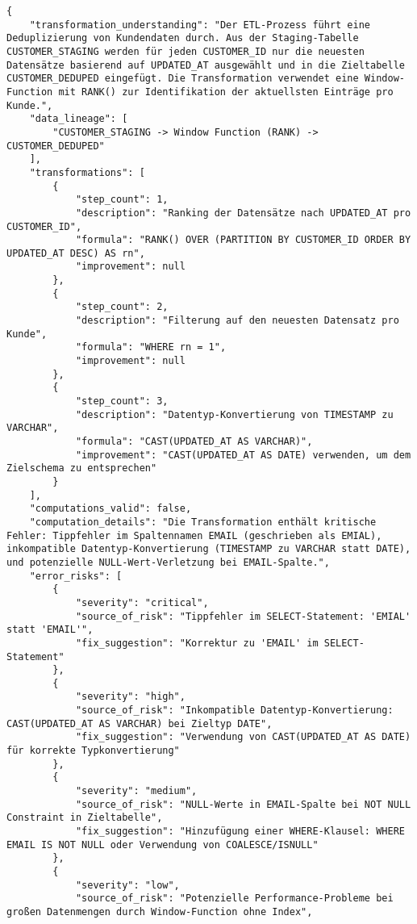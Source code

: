 \begin{lstlisting}[caption={Ausgabe: Claude Sonnet 4 Anwendungsfall 2 Robustheitsdurchlauf},label={claude_case2_prompt3}]
{
    "transformation_understanding": "Der ETL-Prozess führt eine Deduplizierung von Kundendaten durch. Aus der Staging-Tabelle CUSTOMER_STAGING werden für jeden CUSTOMER_ID nur die neuesten Datensätze basierend auf UPDATED_AT ausgewählt und in die Zieltabelle CUSTOMER_DEDUPED eingefügt. Die Transformation verwendet eine Window-Function mit RANK() zur Identifikation der aktuellsten Einträge pro Kunde.",
    "data_lineage": [
        "CUSTOMER_STAGING -> Window Function (RANK) -> CUSTOMER_DEDUPED"
    ],
    "transformations": [
        {
            "step_count": 1,
            "description": "Ranking der Datensätze nach UPDATED_AT pro CUSTOMER_ID",
            "formula": "RANK() OVER (PARTITION BY CUSTOMER_ID ORDER BY UPDATED_AT DESC) AS rn",
            "improvement": null
        },
        {
            "step_count": 2,
            "description": "Filterung auf den neuesten Datensatz pro Kunde",
            "formula": "WHERE rn = 1",
            "improvement": null
        },
        {
            "step_count": 3,
            "description": "Datentyp-Konvertierung von TIMESTAMP zu VARCHAR",
            "formula": "CAST(UPDATED_AT AS VARCHAR)",
            "improvement": "CAST(UPDATED_AT AS DATE) verwenden, um dem Zielschema zu entsprechen"
        }
    ],
    "computations_valid": false,
    "computation_details": "Die Transformation enthält kritische Fehler: Tippfehler im Spaltennamen EMAIL (geschrieben als EMIAL), inkompatible Datentyp-Konvertierung (TIMESTAMP zu VARCHAR statt DATE), und potenzielle NULL-Wert-Verletzung bei EMAIL-Spalte.",
    "error_risks": [
        {
            "severity": "critical",
            "source_of_risk": "Tippfehler im SELECT-Statement: 'EMIAL' statt 'EMAIL'",
            "fix_suggestion": "Korrektur zu 'EMAIL' im SELECT-Statement"
        },
        {
            "severity": "high",
            "source_of_risk": "Inkompatible Datentyp-Konvertierung: CAST(UPDATED_AT AS VARCHAR) bei Zieltyp DATE",
            "fix_suggestion": "Verwendung von CAST(UPDATED_AT AS DATE) für korrekte Typkonvertierung"
        },
        {
            "severity": "medium",
            "source_of_risk": "NULL-Werte in EMAIL-Spalte bei NOT NULL Constraint in Zieltabelle",
            "fix_suggestion": "Hinzufügung einer WHERE-Klausel: WHERE EMAIL IS NOT NULL oder Verwendung von COALESCE/ISNULL"
        },
        {
            "severity": "low",
            "source_of_risk": "Potenzielle Performance-Probleme bei großen Datenmengen durch Window-Function ohne Index",

\end{lstlisting}
